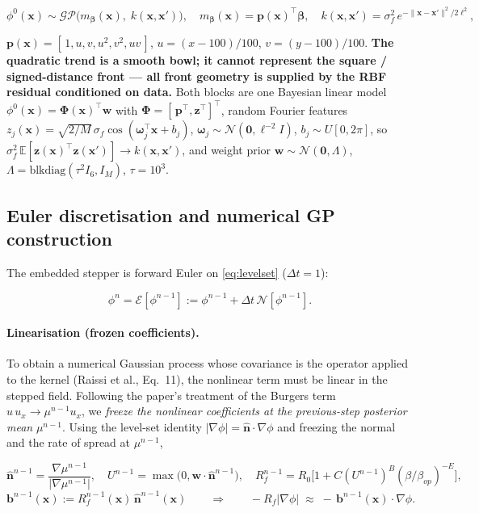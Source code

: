 \documentclass[11pt]{article}
\newcommand{\bx}{\mathbf{x}}
\newcommand{\bw}{\mathbf{w}}
\newcommand{\bb}{\mathbf{b}}
\newcommand{\nhat}{\hat{\mathbf n}}
\newcommand{\GP}{\mathcal{GP}}
\newcommand{\N}{\mathcal{N}}
\begin{document}
\begin{equation}
  \label{eq:prior}
  \phi^{0}(\bx)\sim\GP\!\bigl(m_{\bm\beta}(\bx),\;k(\bx,\bx')\bigr),
  \quad
  m_{\bm\beta}(\bx)=\mathbf{p}(\bx)^{\!\top}\bm\beta,
  \quad
  k(\bx,\bx')=\sigma_f^{2}\,e^{-\lVert\bx-\bx'\rVert^{2}/2\ell^{2}},
\end{equation}

$\mathbf{p}(\bx)=[\,1,u,v,u^{2},v^{2},uv\,]$, $u=(x-100)/100$, $v=(y-100)/100$.
\textbf{The quadratic trend is a smooth bowl; it cannot represent the square /
signed-distance front --- all front geometry is supplied by the RBF residual
conditioned on data.} Both blocks are one Bayesian linear model
$\phi^{0}(\bx)=\bm\Phi(\bx)^{\!\top}\bw$ with
$\bm\Phi=[\,\mathbf{p}^{\!\top},\mathbf{z}^{\!\top}]^{\!\top}$, random Fourier
features $z_j(\bx)=\sqrt{2/M}\,\sigma_f\cos(\bm\omega_j^{\!\top}\bx+b_j)$,
$\bm\omega_j\sim\N(\mathbf 0,\ell^{-2}I)$, $b_j\sim U[0,2\pi]$, so
$\sigma_f^2\,\mathbb E[\mathbf z(\bx)^{\!\top}\mathbf z(\bx')]\!\to\!k(\bx,\bx')$,
and weight prior $\bw\sim\N(\mathbf 0,\Lambda)$,
$\Lambda=\mathrm{blkdiag}(\tau^{2}I_6,I_M)$, $\tau=10^3$.

\subsection{Euler discretisation and numerical GP construction}

The embedded stepper is forward Euler on \eqref{eq:levelset} ($\Delta t=1$):

\begin{equation}
  \label{eq:euler}
  \phi^{n}=\mathcal{E}[\phi^{n-1}]
  :=\phi^{n-1}+\Delta t\,\N[\phi^{n-1}].
\end{equation}

\paragraph{Linearisation (frozen coefficients).}
To obtain a numerical Gaussian process whose covariance is the operator applied to
the kernel (Raissi et al., Eq.~11), the nonlinear term must be linear in the
stepped field. Following the paper's treatment of the Burgers term
$u\,u_x\!\to\!\mu^{n-1}u_x$, we \emph{freeze the nonlinear coefficients at the
previous-step posterior mean} $\mu^{n-1}$. Using the level-set identity
$\lvert\nabla\phi\rvert=\nhat\cdot\nabla\phi$ and freezing the normal and the rate
of spread at $\mu^{n-1}$,

\begin{equation}
  \label{eq:frozen}
  \nhat^{n-1}=\frac{\nabla\mu^{n-1}}{\lvert\nabla\mu^{n-1}\rvert},
  \quad
  U^{n-1}=\max\!\bigl(0,\bw\cdot\nhat^{n-1}\bigr),
  \quad
  R_f^{n-1}=R_0\bigl[1+C(U^{n-1})^{B}(\beta/\beta_{op})^{-E}\bigr],
\end{equation}
\begin{equation}
  \label{eq:advfield}
  \bb^{n-1}(\bx):=R_f^{n-1}(\bx)\,\nhat^{n-1}(\bx)
  \qquad\Longrightarrow\qquad
  -R_f\lvert\nabla\phi\rvert\;\approx\;-\,\bb^{n-1}(\bx)\cdot\nabla\phi .
\end{equation}
\end{document}
